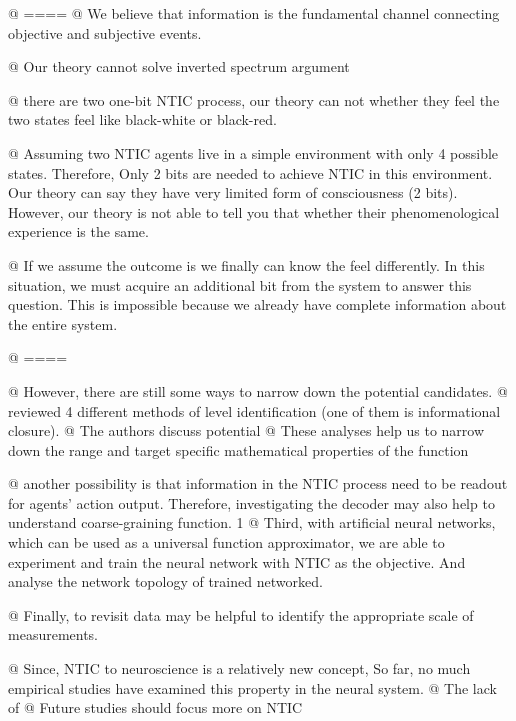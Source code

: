 \documentclass[utf8]{article}
\begin{document}
        \begin{ants}
        
        
        @ ====
        @ We believe that information is the fundamental channel connecting objective and subjective events. 
    
        
        @ Our theory cannot solve inverted spectrum argument 
        
        @ there are two one-bit NTIC process, our theory can not whether they feel the two states feel like black-white or black-red. 
        
        @ Assuming two NTIC agents live in a simple environment with only 4 possible states. Therefore, Only 2 bits are needed to achieve NTIC in this environment. Our theory can say they have very limited form of consciousness (2 bits). However, our theory is not able to tell you that whether their phenomenological experience is the same. 
        
        @ If we assume the outcome is we finally can know the feel differently. In this situation, we must acquire an additional bit from the system to answer this question. This is impossible because we already have complete information about the entire system. 
        
        @ ====
        
        
        
        
        @ However, there are still some ways to narrow down the potential candidates. 
        @ \cite{PFANTE.2014} reviewed 4 different methods of level identification (one of them is informational closure). 
        @ The authors discuss potential 
        @ These analyses help us to narrow down the range and target specific mathematical properties of the function 
        
        @ another possibility is that information in the NTIC process need to be readout for agents' action output. Therefore, investigating the decoder may also help to understand coarse-graining function. 
        1
        @ Third, with artificial neural networks, which can be used as a universal function approximator, we are able to experiment and train the neural network with NTIC as the objective. And analyse the network topology of trained networked.
        
        @ Finally, to revisit data may be helpful to identify the appropriate scale of measurements. 
        
         
        
        @ Since, NTIC to neuroscience is a relatively new concept, So far, no much empirical studies have examined this property in the neural system. 
        @ The lack of 
        @ Future studies should focus more on NTIC
        
        
        
        
        
		\end{ants}
		
\end{document}
